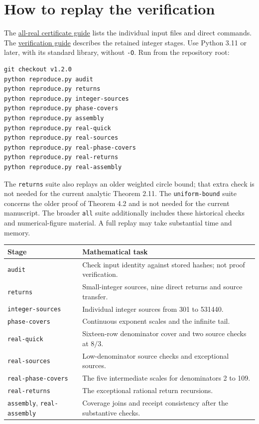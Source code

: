 \documentclass[11pt,a4paper]{article}
\begin{document}
\section{How to replay the verification}
The \href{https://github.com/Nero-17/LEAN-Formalisation-solutions-of-fermat-cantor-equation/blob/v1.2.0/docs/real-exponents.md}{all-real certificate guide}
lists the individual input files and direct commands. The
\href{https://github.com/Nero-17/LEAN-Formalisation-solutions-of-fermat-cantor-equation/blob/v1.2.0/docs/verification.md}{verification guide}
describes the retained integer stages. Use Python 3.11 or later, with its
standard library, without \texttt{-O}. Run from the repository root:
\begin{verbatim}
git checkout v1.2.0
python reproduce.py audit
python reproduce.py returns
python reproduce.py integer-sources
python reproduce.py phase-covers
python reproduce.py assembly
python reproduce.py real-quick
python reproduce.py real-sources
python reproduce.py real-phase-covers
python reproduce.py real-returns
python reproduce.py real-assembly
\end{verbatim}
The \texttt{returns} suite also replays an older weighted circle bound;
that extra check is not needed for the current analytic Theorem 2.11.
The \texttt{uniform-bound} suite concerns the older proof of Theorem 4.2
and is not needed for the current manuscript. The broader \texttt{all}
suite additionally includes these historical checks and numerical-figure
material. A full replay may take substantial time and memory.

\begin{center}
\begin{tabular}{p{.27\linewidth}p{.65\linewidth}}
\toprule
Stage & Mathematical task \\
\midrule
\texttt{audit} & Check input identity against stored hashes; not proof verification. \\
\texttt{returns} & Small-integer sources, nine direct returns and source transfer. \\
\texttt{integer-sources} & Individual integer sources from 301 to 531440. \\
\texttt{phase-covers} & Continuous exponent scales and the infinite tail. \\
\texttt{real-quick} & Sixteen-row denominator cover and two source checks at $8/3$. \\
\texttt{real-sources} & Low-denominator source checks and exceptional sources. \\
\texttt{real-phase-covers} & The five intermediate scales for denominators 2 to 109. \\
\texttt{real-returns} & The exceptional rational return recursions. \\
\texttt{assembly}, \texttt{real-assembly} & Coverage joins and receipt consistency after the substantive checks. \\
\bottomrule
\end{tabular}
\end{center}
\end{document}

